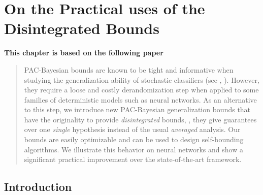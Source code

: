 \chapter{On the Practical uses of the Disintegrated Bounds}
\label{chap:dis-pra}
\addchapterlof
\addchapterloe

\vspace{-2.0cm}
\begin{center}
\textbf{This chapter is based on the following paper}\\[-0.1cm]
\end{center}

\vspace{0.2cm}
\minitoc

\begin{abstract}
\vspace{-0.2cm}
PAC-Bayesian bounds are known to be tight and informative when studying the generalization ability of stochastic classifiers (see \eg, ).
However, they require a loose and costly derandomization step when applied to some families of deterministic models such as neural networks.
As an alternative to this step, we introduce new PAC-Bayesian generalization bounds that have the originality to provide {\it disintegrated} bounds, \ie, they give guarantees over one {\it single} hypothesis instead of the usual {\it averaged} analysis.
Our bounds are easily optimizable and can be used to design self-bounding algorithms.
We illustrate this behavior on neural networks and show a significant practical improvement over the state-of-the-art framework.
\end{abstract}

\newpage
    
\section{Introduction}
\label{chap:dis-pra:sec:intro}

